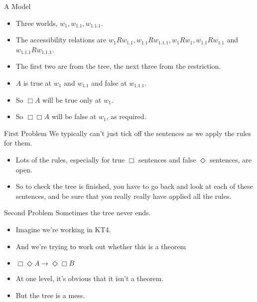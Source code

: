 \documentclass[
  ignorenonframetext,
]{beamer}
\providecommand{\tightlist}{%
  \setlength{\itemsep}{0pt}\setlength{\parskip}{0pt}}
\renewcommand{\,}{\text{, }}
\begin{document}
\begin{frame}{A Model}
\protect\hypertarget{a-model}{}
\begin{itemize}
\tightlist
\item
  Three worlds, \(w_1, w_{1.1}, w_{1.1.1}\).
\item
  The accessibility relations are
  \(w_1Rw_{1.1}, w_{1.1}Rw_{1.1.1}, w_1Rw_1, w_{1.1}Rw_{1.1}\) and
  \(w_{1.1.1}Rw_{1.1.1}\).
\item
  The first two are from the tree, the next three from the restriction.
\item
  \(A\) is true at \(w_1\) and \(w_{1.1}\) and false at \(w_{1.1.1}\).
\item
  So \(\Box A\) will be true only at \(w_1\).
\item
  So \(\Box \Box A\) will be false at \(w_1\), as required.
\end{itemize}
\end{frame}

\begin{frame}{First Problem}
\protect\hypertarget{first-problem}{}
We typically can't just tick off the sentences as we apply the rules for
them.

\begin{itemize}
\tightlist
\item
  Lots of the rules, especially for true \(\Box\) sentences and false
  \(\Diamond\) sentences, are open.
\item
  So to check the tree is finished, you have to go back and look at each
  of these sentences, and be sure that you really really have applied
  all the rules.
\end{itemize}
\end{frame}

\begin{frame}{Second Problem}
\protect\hypertarget{second-problem}{}
Sometimes the tree never ends.

\begin{itemize}
\tightlist
\item
  Imagine we're working in KT4.
\item
  And we're trying to work out whether this is a theorem
\item
  \(\Box \Diamond A \rightarrow \Diamond \Box B\)
\item
  At one level, it's obvious that it isn't a theorem.
\item
  But the tree is a mess.
\end{itemize}
\end{frame}
\end{document}
